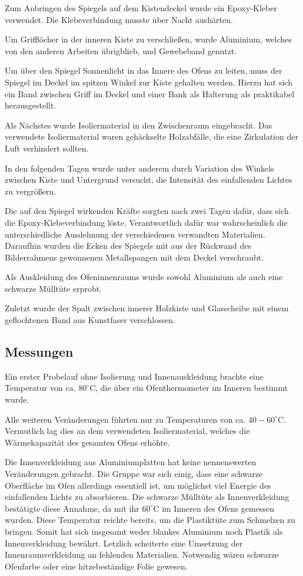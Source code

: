 Zum Anbringen des Spiegels auf dem Kistendeckel wurde ein Epoxy-Kleber verwendet. Die Klebeverbindung musste über Nacht aushärten.

Um Grifflöcher in der inneren Kiste zu verschließen, wurde Aluminium, welches von den anderen Arbeiten übrigblieb, und Gewebeband genutzt. 

Um über den Spiegel Sonnenlicht in das Innere des Ofens zu leiten, muss der Spiegel im Deckel im spitzen Winkel zur Kiste gehalten werden. Hierzu hat sich ein Band zwischen Griff im Deckel und einer Bank als Halterung als praktikabel herausgestellt.
  
Als Nächstes wurde Isoliermaterial in den Zwischenraum eingebracht. Das verwendete Isoliermaterial waren gehäckselte Holzabfälle, die eine Zirkulation der Luft verhindert sollten. 

In den folgenden Tagen wurde unter anderem durch Variation des Winkels zwischen Kiste und Untergrund versucht, die Intensität des einfallenden Lichtes zu vergrößern.

Die auf den Spiegel wirkenden Kräfte sorgten nach zwei Tagen dafür, dass sich die Epoxy-Klebeverbindung löste. Verantwortlich dafür war wahrscheinlich die unterschiedliche Ausdehnung der verschiedenen verwandten Materialien.  Daraufhin wurden die Ecken des Spiegels mit aus der Rückwand des Bilderrahmens gewonnenen Metallspangen mit dem Deckel verschraubt.  %

Als Auskleidung des Ofeninnenraums wurde sowohl Aluminium als auch eine schwarze Mülltüte erprobt. 

Zuletzt wurde der Spalt zwischen innerer Holzkiste und Glasscheibe mit einem geflochtenen Band aus Kunstfaser verschlossen.


\subsection{Messungen}
Ein erster Probelauf ohne Isolierung und Innenauskleidung brachte eine Temperatur von ca. $80^\circ$C, die über ein Ofenthermometer im Inneren bestimmt wurde.

Alle weiteren Veränderungen führten nur zu Temperaturen von ca. $40-60^\circ$C. Vermutlich lag dies an dem verwendeten Isoliermaterial, welches die Wärmekapazität des gesamten Ofens erhöhte.

Die Innenverkleidung aus Aluminiumplatten hat keine nennenswerten Veränderungen gebracht. Die Gruppe war sich einig, dass eine schwarze Oberfläche im Ofen allerdings essentiell ist, um möglichst viel Energie des einfallenden Lichts zu absorbieren. Die schwarze Mülltüte als Innenverkleidung bestätigte diese Annahme, da mit ihr $60^\circ$C im Inneren des Ofens gemessen wurden. Diese Temperatur reichte bereits, um die Plastiktüte zum Schmelzen zu bringen. 
Somit hat sich insgesamt weder blankes Aluminium noch Plastik als Innenverkleidung bewährt. Letzlich scheiterte eine Umsetzung der Innenraumverkleidung an fehlenden Materialien. Notwendig wären schwarze Ofenfarbe oder eine hitzebeständige Folie gewesen.

